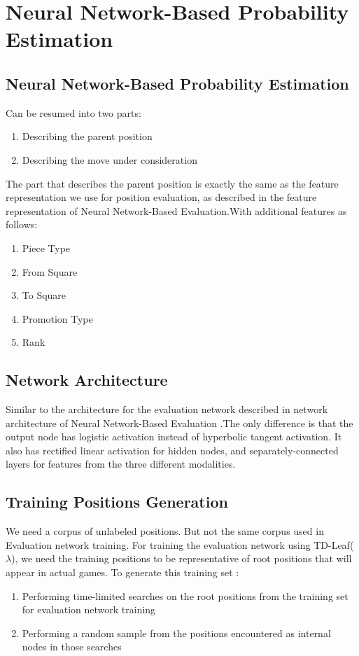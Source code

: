 \section{Neural Network-Based Probability Estimation}
		\subsection{Neural Network-Based Probability Estimation}
			Can be resumed into two parts:
			\begin{enumerate}
				\item Describing the parent position
				\item Describing the move under consideration
			\end{enumerate}
			The part that describes the parent position is exactly the same as the feature representation we use for position evaluation, as described in the feature representation of Neural Network-Based Evaluation.With additional features as follows:
			\begin{enumerate}
				\item Piece Type
				\item From Square
				\item To Square
				\item Promotion Type
				\item Rank
			\end{enumerate}
		\subsection{Network Architecture}
			Similar to the architecture for the evaluation network described in network architecture of Neural Network-Based Evaluation .The only difference is that the output node has logistic activation instead of hyperbolic tangent activation. It also has rectified linear activation for hidden nodes, and separately-connected layers for features from the three different modalities.
		\subsection{Training Positions Generation}
		We need a corpus of unlabeled positions.
		But not the same corpus used in Evaluation network training.
		For training the evaluation network using TD-Leaf($\lambda$), we need the training positions to be representative of root positions that will appear in actual games.
		To generate this training set :
		\begin{enumerate}
			\item Performing time-limited searches on the root positions from the training set for evaluation network training
			\item Performing a random sample from the positions encountered as internal nodes in those searches
		\end{enumerate}

